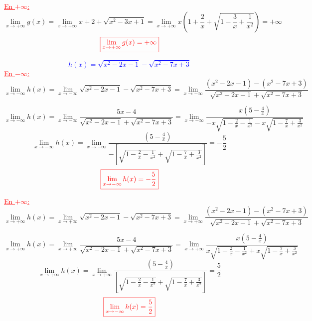 \documentclass{article}
\begin{document}
\textcolor{red}{\underline{En $+\infty$:}}
\[\lim_{x \to +\infty}g(x)=\lim_{x \to +\infty}x+2+\sqrt{x^{2}-3x+1}=\lim_{x \to +\infty}x\left(1+\frac{2}{x}+\sqrt{1-\frac{3}{x}+\frac{1}{x^{2}}}\right)=+\infty\] 
\[\textcolor{red}{\boxed{\lim_{x \to +\infty}g(x)=+\infty}}\]

\textcolor{blue}{\[h(x)=\sqrt{x^{2}-2x-1}-\sqrt{x^{2}-7x+3}\]}
\textcolor{red}{\underline{En $-\infty$:}}
\[\lim_{x \to -\infty}h(x)=\lim_{x \to -\infty}\sqrt{x^{2}-2x-1}-\sqrt{x^{2}-7x+3}=\lim_{x \to -\infty}\frac{\left( x^{2}-2x-1\right) -\left( x^{2}-7x+3\right)}{\sqrt{x^{2}-2x-1}+\sqrt{x^{2}-7x+3}}\]
 
\[\lim_{x \to -\infty}h(x)=\lim_{x \to -\infty}\frac{5x-4}{\sqrt{x^{2}-2x-1}+\sqrt{x^{2}-7x+3}}=\lim_{x \to -\infty}\frac{x(5-\frac{4}{x})}{-x\sqrt{1-\frac{2}{x}-\frac{1}{x^{2}}}-x\sqrt{1-\frac{7}{x}+\frac{3}{x^{2}}}}\]
\[\lim_{x \to -\infty}h(x)=\lim_{x \to -\infty}\frac{(5-\frac{4}{x})}{-\left[\sqrt{1-\frac{2}{x}-\frac{1}{x^{2}}}+\sqrt{1-\frac{7}{x}+\frac{3}{x^{2}}}\right]}=-\frac{5}{2}\] 
\[\textcolor{red}{\boxed{\lim_{x \to -\infty}h(x)=-\frac{5}{2}}}\]

\textcolor{red}{\underline{En $+\infty$:}}
\[\lim_{x \to +\infty}h(x)=\lim_{x \to +\infty}\sqrt{x^{2}-2x-1}-\sqrt{x^{2}-7x+3}=\lim_{x \to +\infty}\frac{\left( x^{2}-2x-1\right) -\left( x^{2}-7x+3\right)}{\sqrt{x^{2}-2x-1}+\sqrt{x^{2}-7x+3}}\]
 
\[\lim_{x \to +\infty}h(x)=\lim_{x \to +\infty}\frac{5x-4}{\sqrt{x^{2}-2x-1}+\sqrt{x^{2}-7x+3}}=\lim_{x \to +\infty}\frac{x(5-\frac{4}{x})}{x\sqrt{1-\frac{2}{x}-\frac{1}{x^{2}}}+x\sqrt{1-\frac{7}{x}+\frac{3}{x^{2}}}}\]
\[\lim_{x \to +\infty}h(x)=\lim_{x \to +\infty}\frac{(5-\frac{4}{x})}{\left[\sqrt{1-\frac{2}{x}-\frac{1}{x^{2}}}+\sqrt{1-\frac{7}{x}+\frac{3}{x^{2}}}\right]}=\frac{5}{2}\] 
\[\textcolor{red}{\boxed{\lim_{x \to -\infty}h(x)=\frac{5}{2}}}\]
\end{document}
